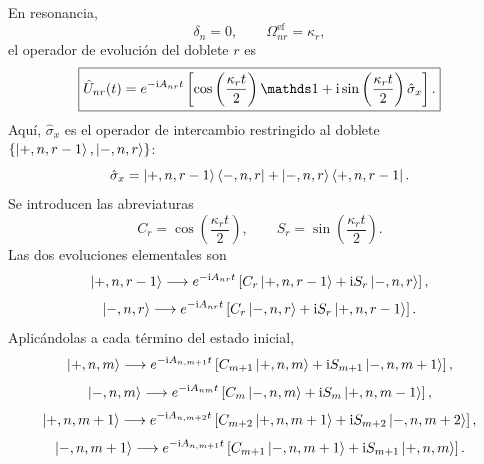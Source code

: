 En resonancia,
\begin{equation}
  \delta_n=0,
  \qquad
  \Omega_{nr}^{\mathrm{ef}}=\kappa_r,
\end{equation}
el operador de evoluci\'on del doblete $r$ es
\begin{equation}
  \boxed{
  \hat U_{nr}(t)
  =
  e^{-\ii A_{nr}t}
  \left[
  \cos\left(\frac{\kappa_rt}{2}\right)\Id
  +
  \ii\sin\left(\frac{\kappa_rt}{2}\right)\hat\sigma_x
  \right].
  }
\end{equation}
Aqu\'i, $\hat\sigma_x$ es el operador de intercambio restringido al doblete
$\{\ket{+,n,r-1},\ket{-,n,r}\}$:
\begin{equation}
  \hat\sigma_x
  =
  \ket{+,n,r-1}\bra{-,n,r}
  +
  \ket{-,n,r}\bra{+,n,r-1}.
\end{equation}
Se introducen las abreviaturas
\begin{equation}
  C_r=\cos\left(\frac{\kappa_rt}{2}\right),
  \qquad
  S_r=\sin\left(\frac{\kappa_rt}{2}\right).
\end{equation}
Las dos evoluciones elementales son
\begin{equation}
  \ket{+,n,r-1}
  \longrightarrow
  e^{-\mathrm{i} A_{nr}t}
  \left[
  C_r\ket{+,n,r-1}
  +\mathrm{i} S_r\ket{-,n,r}
  \right],
\end{equation}
\begin{equation}
  \ket{-,n,r}
  \longrightarrow
  e^{-\mathrm{i} A_{nr}t}
  \left[
  C_r\ket{-,n,r}
  +\mathrm{i} S_r\ket{+,n,r-1}
  \right].
\end{equation}
Aplic\'andolas a cada t\'ermino del estado inicial,
\begin{equation}
  \ket{+,n,m}
  \longrightarrow
  e^{-\mathrm{i} A_{n,m+1}t}
  \left[
  C_{m+1}\ket{+,n,m}
  +\mathrm{i} S_{m+1}\ket{-,n,m+1}
  \right],
\end{equation}
\begin{equation}
  \ket{-,n,m}
  \longrightarrow
  e^{-\mathrm{i} A_{nm}t}
  \left[
  C_m\ket{-,n,m}
  +\mathrm{i} S_m\ket{+,n,m-1}
  \right],
\end{equation}
\begin{equation}
  \ket{+,n,m+1}
  \longrightarrow
  e^{-\mathrm{i} A_{n,m+2}t}
  \left[
  C_{m+2}\ket{+,n,m+1}
  +\mathrm{i} S_{m+2}\ket{-,n,m+2}
  \right],
\end{equation}
\begin{equation}
  \ket{-,n,m+1}
  \longrightarrow
  e^{-\mathrm{i} A_{n,m+1}t}
  \left[
  C_{m+1}\ket{-,n,m+1}
  +\mathrm{i} S_{m+1}\ket{+,n,m}
  \right].
\end{equation}

